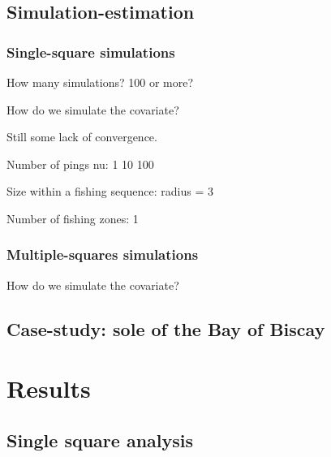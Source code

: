 \documentclass[
  english,
  man]{apa6}
\begin{document}
\hypertarget{simulation-estimation}{%
\subsection{Simulation-estimation}\label{simulation-estimation}}

\hypertarget{single-square-simulations}{%
\subsubsection{Single-square simulations}\label{single-square-simulations}}

How many simulations? 100 or more?

How do we simulate the covariate?

Still some lack of convergence.

Number of pings \textbar{} nu:
1
10
100

Size within a fishing sequence: radius = 3

Number of fishing zones: 1

\hypertarget{multiple-squares-simulations}{%
\subsubsection{Multiple-squares simulations}\label{multiple-squares-simulations}}

How do we simulate the covariate?

\hypertarget{case-study-sole-of-the-bay-of-biscay}{%
\subsection{Case-study: sole of the Bay of Biscay}\label{case-study-sole-of-the-bay-of-biscay}}

\hypertarget{results}{%
\section{Results}\label{results}}

\hypertarget{single-square-analysis}{%
\subsection{Single square analysis}\label{single-square-analysis}}
\end{document}
